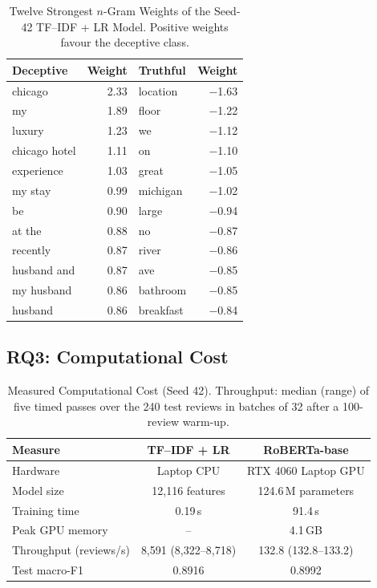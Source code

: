\begin{table}[t]
\centering
\caption{Twelve Strongest $n$-Gram Weights of the Seed-42 TF--IDF + LR Model. Positive weights favour the deceptive class.}
\label{tab:features}
\footnotesize
\begin{tabular}{@{}lr@{\hspace{1.2em}}lr@{}}
\toprule
Deceptive & Weight & Truthful & Weight \\
\midrule
chicago & 2.33 & location & $-$1.63 \\
my & 1.89 & floor & $-$1.22 \\
luxury & 1.23 & we & $-$1.12 \\
chicago hotel & 1.11 & on & $-$1.10 \\
experience & 1.03 & great & $-$1.05 \\
my stay & 0.99 & michigan & $-$1.02 \\
be & 0.90 & large & $-$0.94 \\
at the & 0.88 & no & $-$0.87 \\
recently & 0.87 & river & $-$0.86 \\
husband and & 0.87 & ave & $-$0.85 \\
my husband & 0.86 & bathroom & $-$0.85 \\
husband & 0.86 & breakfast & $-$0.84 \\
\bottomrule
\end{tabular}
\end{table}

\subsection{RQ3: Computational Cost}
\begin{table}[t]
\centering
\caption{Measured Computational Cost (Seed 42). Throughput: median (range) of five timed passes over the 240 test reviews in batches of 32 after a 100-review warm-up.}
\label{tab:cost}
\footnotesize
\begin{tabular}{@{}lcc@{}}
\toprule
Measure & TF--IDF + LR & RoBERTa-base \\
\midrule
Hardware & Laptop CPU & RTX 4060 Laptop GPU \\
Model size & 12,116 features & 124.6\,M parameters \\
Training time & 0.19\,s & 91.4\,s \\
Peak GPU memory & -- & 4.1\,GB \\
Throughput (reviews/s) & 8,591 (8,322--8,718) & 132.8 (132.8--133.2) \\
Test macro-F1 & 0.8916 & 0.8992 \\
\bottomrule
\end{tabular}
\end{table}

